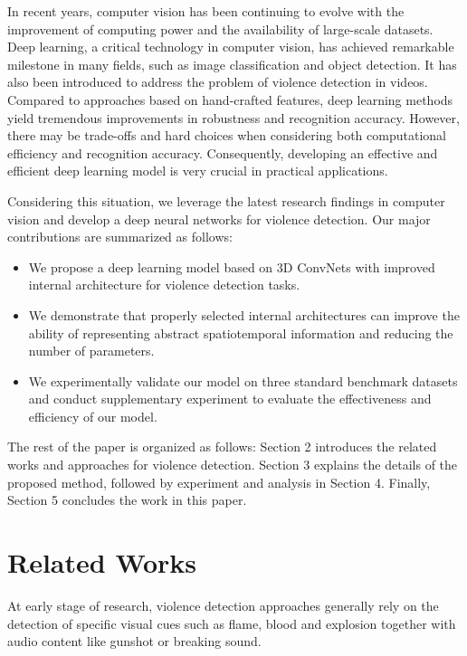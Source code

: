 \documentclass[10pt,twocolumn,letterpaper]{article}
\begin{document}
In recent years, computer vision has been continuing to evolve with the improvement of computing power and the availability of large-scale datasets.
Deep learning, a critical technology in computer vision, has achieved remarkable milestone in many fields, such as image classification and object detection.
It has also been introduced to address the problem of violence detection in videos.
Compared to approaches based on hand-crafted features, deep learning methods yield tremendous improvements in robustness and recognition accuracy.
However, there may be trade-offs and hard choices when considering both computational efficiency and recognition accuracy.
Consequently, developing an effective and efficient deep learning model is very crucial in practical applications.

Considering this situation, we leverage the latest research findings in computer vision and develop a deep neural networks for violence detection. Our major contributions are summarized as follows:
\begin{itemize}
	\item We propose a deep learning model based on 3D ConvNets with improved internal architecture for violence detection tasks.
	\item We demonstrate that properly selected internal architectures can improve the ability of representing abstract spatiotemporal information and reducing the number of parameters.
	\item We experimentally validate our model on three standard benchmark datasets and conduct supplementary experiment to evaluate the effectiveness and efficiency of our model.
\end{itemize}

The rest of the paper is organized as follows: Section 2 introduces the related works and approaches for violence detection. Section 3 explains the details of the proposed method, followed by experiment and analysis in Section 4. Finally, Section 5 concludes the work in this paper.


\section{Related Works}

At early stage of research, violence detection approaches \cite{nam1998audio, cheng2003semantic, zajdel2007cassandra} generally rely on the detection of specific visual cues such as flame, blood and explosion together with audio content like gunshot or breaking sound.
\end{document}
